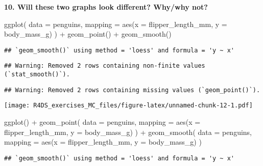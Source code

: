 \documentclass[
]{article}
\newenvironment{Shaded}{\begin{snugshade}}{\end{snugshade}}
\newcommand{\AttributeTok}[1]{\textcolor[rgb]{0.77,0.63,0.00}{#1}}
\newcommand{\FunctionTok}[1]{\textcolor[rgb]{0.00,0.00,0.00}{#1}}
\newcommand{\NormalTok}[1]{#1}
\newcommand{\SpecialCharTok}[1]{\textcolor[rgb]{0.00,0.00,0.00}{#1}}
\begin{document}
\textbf{10. Will these two graphs look different? Why/why not?}

\begin{Shaded}
\begin{Highlighting}[]
\FunctionTok{ggplot}\NormalTok{(}
  \AttributeTok{data =}\NormalTok{ penguins,}
  \AttributeTok{mapping =} \FunctionTok{aes}\NormalTok{(}\AttributeTok{x =}\NormalTok{ flipper\_length\_mm, }\AttributeTok{y =}\NormalTok{ body\_mass\_g)}
\NormalTok{) }\SpecialCharTok{+}
  \FunctionTok{geom\_point}\NormalTok{() }\SpecialCharTok{+}
  \FunctionTok{geom\_smooth}\NormalTok{()}
\end{Highlighting}
\end{Shaded}

\begin{verbatim}
## `geom_smooth()` using method = 'loess' and formula = 'y ~ x'
\end{verbatim}

\begin{verbatim}
## Warning: Removed 2 rows containing non-finite values (`stat_smooth()`).
\end{verbatim}

\begin{verbatim}
## Warning: Removed 2 rows containing missing values (`geom_point()`).
\end{verbatim}

\texttt{[image: R4DS\_exercises\_MC\_files/figure-latex/unnamed-chunk-12-1.pdf]}

\begin{Shaded}
\begin{Highlighting}[]
\FunctionTok{ggplot}\NormalTok{() }\SpecialCharTok{+}
  \FunctionTok{geom\_point}\NormalTok{(}
    \AttributeTok{data =}\NormalTok{ penguins,}
    \AttributeTok{mapping =} \FunctionTok{aes}\NormalTok{(}\AttributeTok{x =}\NormalTok{ flipper\_length\_mm, }\AttributeTok{y =}\NormalTok{ body\_mass\_g)}
\NormalTok{  ) }\SpecialCharTok{+}
  \FunctionTok{geom\_smooth}\NormalTok{(}
    \AttributeTok{data =}\NormalTok{ penguins,}
    \AttributeTok{mapping =} \FunctionTok{aes}\NormalTok{(}\AttributeTok{x =}\NormalTok{ flipper\_length\_mm, }\AttributeTok{y =}\NormalTok{ body\_mass\_g)}
\NormalTok{  )}
\end{Highlighting}
\end{Shaded}

\begin{verbatim}
## `geom_smooth()` using method = 'loess' and formula = 'y ~ x'
\end{verbatim}
\end{document}
